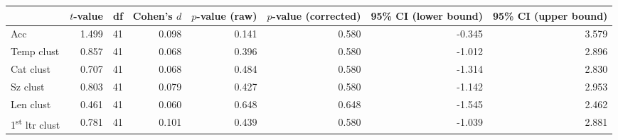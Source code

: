 \begin{tabular}{lrrrrrrr}
\toprule
{} & $t$-value & df & Cohen's $d$ & $p$-value (raw) & $p$-value (corrected) & 95\% CI (lower bound) & 95\% CI (upper bound) \\
\midrule
Acc                             &     1.499 & 41 &       0.098 &           0.141 &                 0.580 &                -0.345 &                 3.579 \\
Temp clust                      &     0.857 & 41 &       0.068 &           0.396 &                 0.580 &                -1.012 &                 2.896 \\
Cat clust                       &     0.707 & 41 &       0.068 &           0.484 &                 0.580 &                -1.314 &                 2.830 \\
Sz clust                        &     0.803 & 41 &       0.079 &           0.427 &                 0.580 &                -1.142 &                 2.953 \\
Len clust                       &     0.461 & 41 &       0.060 &           0.648 &                 0.648 &                -1.545 &                 2.462 \\
1\textsuperscript{st} ltr clust &     0.781 & 41 &       0.101 &           0.439 &                 0.580 &                -1.039 &                 2.881 \\
\bottomrule
\end{tabular}
